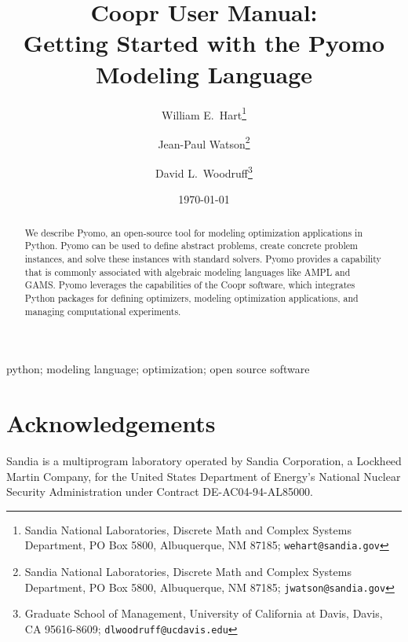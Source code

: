\documentclass[12pt]{book}
\begin{document}
\title{Coopr User Manual:\\Getting Started with the Pyomo Modeling Language}

\author{William E.\ Hart\footnote{Sandia National Laboratories, Discrete Math and Complex Systems Department, PO Box 5800, Albuquerque, NM 87185; {\tt wehart@sandia.gov}} 
\and
Jean-Paul Watson\footnote{Sandia National Laboratories, Discrete Math and Complex Systems Department, PO Box 5800, Albuquerque, NM 87185; {\tt jwatson@sandia.gov}} 
\and
David L.\ Woodruff\footnote{Graduate School of Management, University of California at Davis,
Davis, CA 95616-8609; {\tt dlwoodruff@ucdavis.edu}}
}

\date{\today}

\maketitle

\begin{abstract}
We describe Pyomo, an open-source tool for modeling optimization applications in Python. Pyomo can be used to define abstract problems, create concrete problem instances, and solve these instances with standard solvers. Pyomo provides a capability that is commonly associated with algebraic modeling languages like AMPL and GAMS.  Pyomo leverages the capabilities of the Coopr software, which integrates Python packages for defining optimizers, modeling optimization applications, and managing computational experiments.
\end{abstract}

 python; modeling language; optimization; open source software
\fi


\lstset{language=Python}
\lstset{aboveskip=1em,belowskip=1em}

\tableofcontents










\section*{Acknowledgements} 

Sandia is a multiprogram laboratory
operated by Sandia Corporation, a Lockheed Martin Company, for the United
States Department of Energy's National Nuclear Security Administration
under Contract DE-AC04-94-AL85000.




\end{document}
